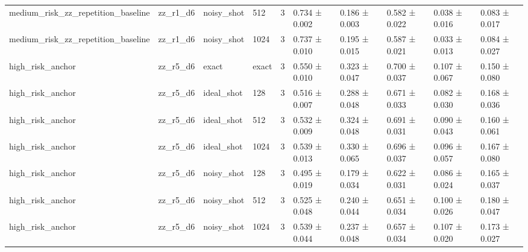 \begin{table}[t]
\begin{tabular}{llllrlllll}
medium\_risk\_zz\_repetition\_baseline & zz\_r1\_d6 & noisy\_shot & 512 & 3 & 0.734 ± 0.002 & 0.186 ± 0.003 & 0.582 ± 0.022 & 0.038 ± 0.016 & 0.083 ± 0.017 \\
medium\_risk\_zz\_repetition\_baseline & zz\_r1\_d6 & noisy\_shot & 1024 & 3 & 0.737 ± 0.010 & 0.195 ± 0.015 & 0.587 ± 0.021 & 0.033 ± 0.013 & 0.084 ± 0.027 \\
high\_risk\_anchor & zz\_r5\_d6 & exact & exact & 3 & 0.550 ± 0.010 & 0.323 ± 0.047 & 0.700 ± 0.037 & 0.107 ± 0.067 & 0.150 ± 0.080 \\
high\_risk\_anchor & zz\_r5\_d6 & ideal\_shot & 128 & 3 & 0.516 ± 0.007 & 0.288 ± 0.048 & 0.671 ± 0.033 & 0.082 ± 0.030 & 0.168 ± 0.036 \\
high\_risk\_anchor & zz\_r5\_d6 & ideal\_shot & 512 & 3 & 0.532 ± 0.009 & 0.324 ± 0.048 & 0.691 ± 0.031 & 0.090 ± 0.043 & 0.160 ± 0.061 \\
high\_risk\_anchor & zz\_r5\_d6 & ideal\_shot & 1024 & 3 & 0.539 ± 0.013 & 0.330 ± 0.065 & 0.696 ± 0.037 & 0.096 ± 0.057 & 0.167 ± 0.080 \\
high\_risk\_anchor & zz\_r5\_d6 & noisy\_shot & 128 & 3 & 0.495 ± 0.019 & 0.179 ± 0.034 & 0.622 ± 0.031 & 0.086 ± 0.024 & 0.165 ± 0.037 \\
high\_risk\_anchor & zz\_r5\_d6 & noisy\_shot & 512 & 3 & 0.525 ± 0.048 & 0.240 ± 0.044 & 0.651 ± 0.034 & 0.100 ± 0.026 & 0.180 ± 0.047 \\
high\_risk\_anchor & zz\_r5\_d6 & noisy\_shot & 1024 & 3 & 0.539 ± 0.044 & 0.237 ± 0.048 & 0.657 ± 0.034 & 0.107 ± 0.020 & 0.173 ± 0.027 \\
\bottomrule
\end{tabular}
\end{table}
